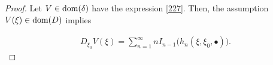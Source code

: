 \documentclass[letterpaper, 11pt,  reqno]{amsart}
\newcommand{\noi}{\noindent}
\newcommand{\R}{\mathbb{R}}
\newcommand{\bul}{\bullet}
\newcommand{\be}{\beta}
\newcommand{\dl}{\delta}
\newcommand{\wt}{\widetilde}
\renewcommand{\O}{\Omega}
\newcommand{\ind}{\mathbf 1}
\newcommand{\fH}{\mathfrak{H}}
\newcommand{\dom}{\textup{dom}}
\numberwithin{equation}{section}
\numberwithin{theorem}{section}
\begin{document}
\begin{proof}

%
%
% 
%
%
% 
 
  Let $V\in\dom(\dl)$  have the expression \eqref{227}.
 Then,   the assumption $V(\xi)\in \dom(D)$ 
 implies 
 
 \noi
 \begin{align}\label{DxV}
 D_{\xi_0} V(\xi) = \sum_{n=1}^\infty n I_{n-1}\big( h_n(\xi, \xi_0, \bul) \big).
 \end{align}


\end{proof}
\end{document}
